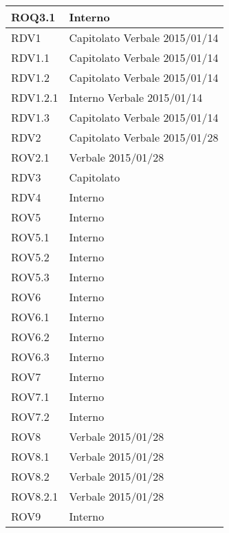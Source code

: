 \begin{center}
\begin{longtable}{| p{4cm} | p{4cm} |}
\hline
ROQ3.1   &  Interno \\
\hline
RDV1   &  Capitolato \newline Verbale 2015/01/14 \\
\hline
RDV1.1   &  Capitolato \newline Verbale 2015/01/14 \\
\hline
RDV1.2   &  Capitolato \newline Verbale 2015/01/14 \\
\hline
RDV1.2.1   &  Interno \newline Verbale 2015/01/14 \\
\hline
RDV1.3   &  Capitolato \newline Verbale 2015/01/14 \\
\hline
RDV2   &  Capitolato \newline Verbale 2015/01/28 \\
\hline
ROV2.1   &  Verbale 2015/01/28 \\
\hline
RDV3   &  Capitolato \\
\hline
RDV4   &  Interno \\
\hline
ROV5   &  Interno \\
\hline
ROV5.1   &  Interno \\
\hline
ROV5.2   &  Interno \\
\hline
ROV5.3   &  Interno \\
\hline
ROV6   &  Interno \\
\hline
ROV6.1   &  Interno \\
\hline
ROV6.2   &  Interno \\
\hline
ROV6.3   &  Interno \\
\hline
ROV7   &  Interno \\
\hline
ROV7.1   &  Interno \\
\hline
ROV7.2   &  Interno \\
\hline
ROV8   &  Verbale 2015/01/28 \\
\hline
ROV8.1   &  Verbale 2015/01/28 \\
\hline
ROV8.2   &  Verbale 2015/01/28 \\
\hline
ROV8.2.1   &  Verbale 2015/01/28 \\
\hline
ROV9   &  Interno \\
\hline
\end{longtable}
\egroup
\end{center}
